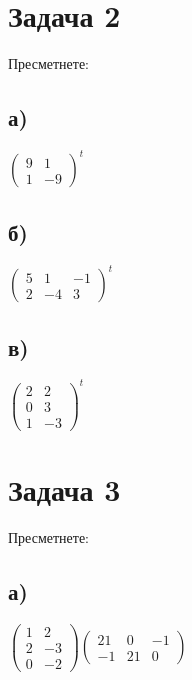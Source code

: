 \documentclass[12pt]{article}
\begin{document}
\section*{Задача 2}
    
Пресметнете:

\subsection*{а)}

$\begin{pmatrix}
    9 & 1 \\
    1 & -9
\end{pmatrix}^t$

\subsection*{б)}

$\begin{pmatrix}
    5 & 1 & -1 \\
    2 & -4 & 3
\end{pmatrix}^t$

\subsection*{в)}

$\begin{pmatrix}
    2 & 2 \\
    0 & 3 \\
    1 & -3
\end{pmatrix}^t$

\section*{Задача 3}

Пресметнете:

\subsection*{а)}

$\begin{pmatrix}
    1 & 2 \\
    2 & -3 \\
    0 & -2
\end{pmatrix} \begin{pmatrix}
    21 & 0 & -1 \\
    -1 & 21 & 0
\end{pmatrix}$
\end{document}

